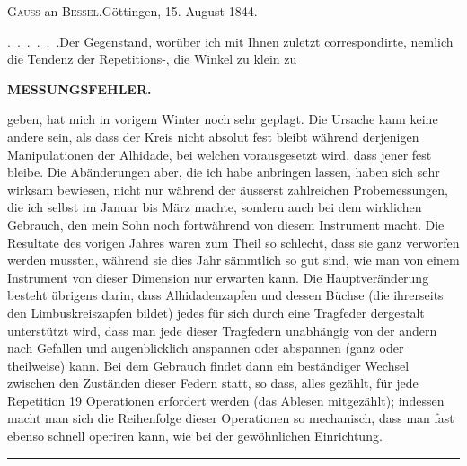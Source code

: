 \par\bigskip
\begin{center}{\large\textsc{Gauss} an \textsc{Bessel}.\quad Göttingen, 15. August 1844.}\end{center}
\par\noindent\hspace*{\parindent}.\ .\ .\ .\ .\ .\enspace Der Gegenstand, worüber ich mit Ihnen zuletzt correspondirte, nemlich die Tendenz der Repetitions-, die Winkel zu klein zu

\par\clearpage
\noindent\null\hfill{\small\textbf{MESSUNGSFEHLER.}}\hfill{}\par\medskip
\noindent geben, hat mich in vorigem Winter noch sehr geplagt. Die Ursache kann keine andere sein, als dass der Kreis nicht absolut fest bleibt während derjenigen Manipulationen der Alhidade, bei welchen vorausgesetzt wird, dass jener fest bleibe. Die Abänderungen aber, die ich habe anbringen lassen, haben sich sehr wirksam bewiesen, nicht nur während der äusserst zahlreichen Probemessungen, die ich selbst im Januar bis März machte, sondern auch bei dem wirklichen Gebrauch, den mein Sohn noch fortwährend von diesem Instrument macht. Die Resultate des vorigen Jahres waren zum Theil so schlecht, dass sie ganz verworfen werden mussten, während sie dies Jahr sämmtlich so gut sind, wie man von einem Instrument von dieser Dimension nur erwarten kann. Die Hauptveränderung besteht übrigens darin, dass Alhidadenzapfen und dessen Büchse (die ihrerseits den Limbuskreiszapfen bildet) jedes für sich durch eine Tragfeder dergestalt unterstützt wird, dass man jede dieser Tragfedern unabhängig von der andern nach Gefallen und augenblicklich anspannen oder abspannen (ganz oder theilweise) kann. Bei dem Gebrauch findet dann ein  beständiger Wechsel zwischen den Zuständen dieser Federn statt, so dass, alles gezählt, für jede Repetition 19 Operationen erfordert werden (das Ablesen mitgezählt); indessen macht man sich die Reihenfolge dieser Operationen so mechanisch, dass man fast ebenso schnell operiren kann, wie bei der gewöhnlichen Einrichtung.
\par\bigskip
\begin{center}\rule{2.6cm}{.4pt}\end{center}
\vspace{1.2cm}
